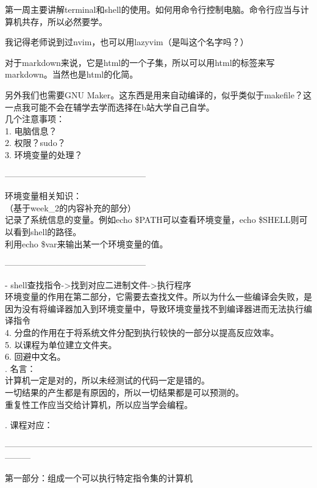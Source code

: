 \documentclass{article}
\begin{document}
第一周主要讲解terminal和shell的使用。如何用命令行控制电脑。命令行应当与计算机共存，所以必然要学。

我记得老师说到过nvim，也可以用lazyvim（是叫这个名字吗？）

对于markdown来说，它是html的一个子集，所以可以用html的标签来写markdown。当然也是html的化简。

另外我们也需要GNU Maker。这东西是用来自动编译的，似乎类似于makefile？这一点我可能不会在辅学去学而选择在b站大学自己自学。
\\

\noindent 几个注意事项：\\
1. 电脑信息？\\
2. 权限？sudo？\\
3. 环境变量的处理？
\begin{center}
    --------------------------------------------------
\end{center}
环境变量相关知识：\\
（基于week\_2的内容补充的部分）\\
记录了系统信息的变量。例如echo \$PATH可以查看环境变量，echo \$SHELL则可以看到shell的路径。\\
利用echo \$var来输出某一个环境变量的值。
\begin{center}
    --------------------------------------------------
\end{center}
- shell查找指令->找到对应二进制文件->执行程序\\
环境变量的作用在第二部分，它需要去查找文件。所以为什么一些编译会失败，是因为没有将编译器加入到环境变量中，导致环境变量找不到编译器进而无法执行编译指令\\
4. 分盘的作用在于将系统文件分配到执行较快的一部分以提高反应效率。\\
5. 以课程为单位建立文件夹。\\
6. 回避中文名。\\

. 名言：\\
计算机一定是对的，所以未经测试的代码一定是错的。\\
一切结果的产生都是有原因的，所以一切结果都是可以预测的。\\
重复性工作应当交给计算机，所以应当学会编程。

. 课程对应：
\begin{center}
    ———————————————————————————————————————
\end{center}
第一部分：组成一个可以执行特定指令集的计算机\\
\end{document}

